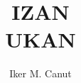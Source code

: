 \documentclass[12pt, a4paper, landscape]{article}
\begin{document}
\author{Iker M. Canut}
\title{
\large{IZAN \\ UKAN\\}
}
\maketitle
\newpage

\tableofcontents
\newpage

\begin{center}
\begin{tabular}{|c|c|c|c|c|c|c|c|}
\end{tabular}
\end{center}
\end{document}
